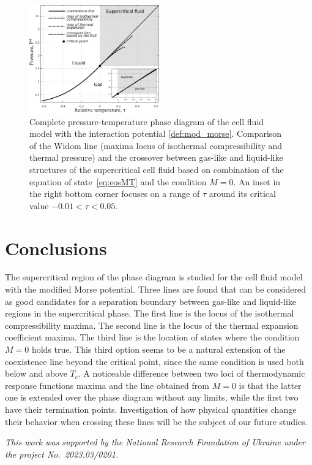 \begin{figure}[h!]
	\centering \includegraphics[width=0.5\textwidth]{f4b.pdf}
	\vskip-3mm\caption{Complete pressure-temperature phase diagram of the cell fluid model with the interaction potential \eqref{def:mod_morse}. Comparison of the Widom line (maxima locus of isothermal compressibility and thermal pressure) and the crossover between gas-like and liquid-like structures of the supercritical cell fluid based on combination of the equation of state~\eqref{eq:eosMT} and the condition $M = 0$. An inset in the right bottom corner focuses on a range of $\tau$ around its critical value $-0.01 < \tau < 0.05$.	}\label{fig4}
\end{figure}

\section{Conclusions}
The supercritical region of the phase diagram is studied for the cell fluid model with the modified Morse potential. Three lines are found that can be considered as good candidates for a separation boundary between gas-like and liquid-like regions in the supercritical phase. The first line is the locus of the isothermal compressibility maxima. The second line is the locus of the thermal expansion coefficient maxima. The third line is the location of states where the condition $M=0$ holds true. This third option seems to be a natural extension of the coexistence line beyond the critical point, since the same condition is used both below and above $T_c$. A noticeable difference between two loci of thermodynamic response functions maxima and the line obtained from $M=0$ is that the latter one is extended over the phase diagram without any limits, while the first two have their termination points. Investigation of how physical quantities change their behavior when crossing these lines will be the subject of our future studies.


\vskip3mm \textit{This work was supported by the National Research Foundation of Ukraine under the project No.~2023.03/0201.}